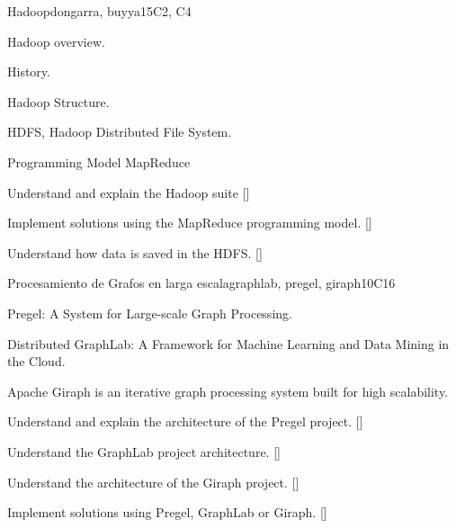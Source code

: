 \begin{syllabus}
\begin{unit}{Hadoop}{}{dongarra, buyya}{15}{C2, C4}
\begin{topics}
    \item Hadoop overview.
    \item History.
    \item Hadoop Structure.
    \item HDFS, Hadoop Distributed File System.
    \item Programming Model MapReduce
\end{topics}
\begin{learningoutcomes}
      \item Understand and explain the Hadoop suite [\Familiarity]
      \item Implement solutions using the MapReduce programming model. [\Usage]
      \item Understand how data is saved in the HDFS. [\Familiarity] %
\end{learningoutcomes}
\end{unit}

\begin{unit}{Procesamiento de Grafos en larga escala}{}{graphlab, pregel, giraph}{10}{C16}
\begin{topics}
    \item Pregel: A System for Large-scale Graph Processing.
    \item Distributed GraphLab: A Framework for Machine Learning and Data Mining in the Cloud.
    \item Apache Giraph is an iterative graph processing system built for high scalability.
\end{topics}
\begin{learningoutcomes}
      \item Understand and explain the architecture of the Pregel project. [\Familiarity]
	  \item Understand the GraphLab project architecture. [\Familiarity]
	  \item Understand the architecture of the Giraph project.  [\Familiarity]
	  \item Implement solutions using Pregel, GraphLab or Giraph. [\Usage]
\end{learningoutcomes}
\end{unit}

\begin{coursebibliography}
\end{coursebibliography}

\end{syllabus}
